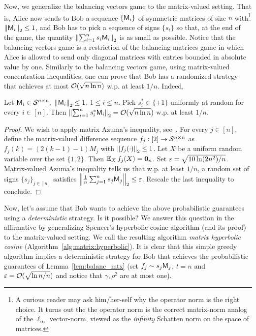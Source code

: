 %
Now, we generalize the balancing vectors game to the matrix-valued setting. That is, Alice now sends to Bob a sequence $\{{\mathsf{M} }_i\}$ of symmetric matrices of size $n$ with\footnote{A curious reader may ask him/her-self why the operator norm is the right choice. It turns out the the operator norm is the correct matrix-norm analog of the $\ell_\infty$ vector-norm, viewed as the \emph{infinity} Schatten norm on the space of matrices.} $\left\|{\mathsf{M} }_i\right\|_2\leq 1$, and Bob has to pick a sequence of signs $\{s_i\}$ so that, at the end of the game, the quantity $\left\|\sum_{i=1}^{n} s_i {\mathsf{M} }_i\right\|_2 $ is as small as possible. Notice that the balancing vectors game is a restriction of the balancing matrices game in which Alice is allowed to send only diagonal matrices with entries bounded in absolute value by one. Similarly to the balancing vectors game, using matrix-valued concentration inequalities, one can prove that Bob has a randomized strategy that achieves at most $\mathcal{O}(\sqrt{n\ln n})$ w.p. at least $1/n$. Indeed,
%
%
\begin{lemma}\label{lem:balanc_mtx}
Let ${\mathsf{M} }_i \in \mathcal{S}^{n\times n}$, $\left\|{\mathsf{M} }_i\right\|_2 \leq 1$, $1 \leq i \leq n$. Pick $s_i^*\in{\{\pm 1\} }$ uniformly at random for every $i\in{[n]}$. Then $\left\|\sum_{i=1}^{n} s_i^* {\mathsf{M} }_i\right\|_2 = \mathcal{O}(\sqrt{  n \ln n})$ w.p. at least $1/n$.
\end{lemma}
\begin{proof}
We wish to apply matrix Azuma's inequality, see~\cite[Theorem~$7.1$]{chernoff:matrix_valued:Tropp}. For every $j\in{[n]}$, define the matrix-valued difference sequence $f_j: [2] \to \mathcal{S}^{n\times n}$ as $f_j(k) = (2(k -1) -1 )M_j $ with $\left\|f_j(\cdot)\right\|_2 \leq 1$. Let $X$ be a uniform random variable over the set $\{1,2\}$. Then $\operatorname{\mathbb{E}}_X f_j(X)= \mathbf{0}_n$. Set $\varepsilon = \sqrt{10\ln (2 n^2) / n}$. Matrix-valued Azuma's inequality tells us that w.p. at least $1/n$, a random set of signs $\{s_j\}_{j\in{[n]}}$ satisfies $\left\|\frac1{n} \sum_{j=1}^{n} s_j {\mathsf{M} }_j \right\|_2 \leq \varepsilon$. Rescale the last inequality to conclude.
\end{proof}
%
%
Now, let's assume that Bob wants to achieve the above probabilistic guarantees using a \emph{deterministic} strategy. Is it possible? We answer this question in the affirmative by generalizing Spencer's hyperbolic cosine algorithm (and its proof) to the matrix-valued setting. We call the resulting algorithm \emph{matrix hyperbolic cosine} (Algorithm~\ref{alg:matrix:hyperbolic}). It is clear that this simple greedy algorithm implies a deterministic strategy for Bob that achieves the probabilistic guarantees of Lemma~\ref{lem:balanc_mtx} (set $f_j\sim s_j {\mathsf{M} }_j$, $t=n$ and $\varepsilon = \mathcal{O}(\sqrt{ \ln n / n})$ and notice that $\gamma,\rho^2$ are at most one).
%

